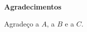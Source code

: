 
\cleardoublepage\thispagestyle{plain}

\begin{otherlanguage}{portuguese}
  \textbf{\Large Agradecimentos}

  Agradeço a $A$, a $B$ e a $C$.
\end{otherlanguage}
